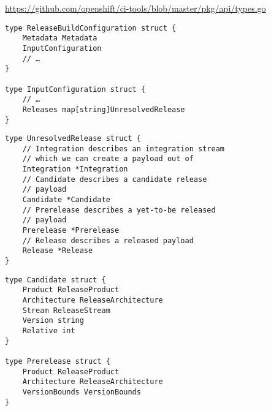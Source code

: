 \begin{frame}
    \sectiontitleframe
\end{frame}

\begin{frame}[fragile]
    \autotitle
    \url{https://github.com/openshift/ci-tools/blob/master/pkg/api/types.go}
    \vfill
    \begin{verbatim}
type ReleaseBuildConfiguration struct {
    Metadata Metadata
    InputConfiguration
    // …
}

type InputConfiguration struct {
    // …
    Releases map[string]UnresolvedRelease
}
    \end{verbatim}
    \vfill
\end{frame}

\begin{frame}[fragile]
    \autotitle
    \begin{verbatim}
type UnresolvedRelease struct {
    // Integration describes an integration stream
    // which we can create a payload out of
    Integration *Integration
    // Candidate describes a candidate release
    // payload
    Candidate *Candidate
    // Prerelease describes a yet-to-be released
    // payload
    Prerelease *Prerelease
    // Release describes a released payload
    Release *Release
}
    \end{verbatim}
\end{frame}

\begin{frame}[fragile]
    \autotitle
    \begin{verbatim}
type Candidate struct {
    Product ReleaseProduct
    Architecture ReleaseArchitecture
    Stream ReleaseStream
    Version string
    Relative int
}

type Prerelease struct {
    Product ReleaseProduct
    Architecture ReleaseArchitecture
    VersionBounds VersionBounds
}
    \end{verbatim}
\end{frame}

